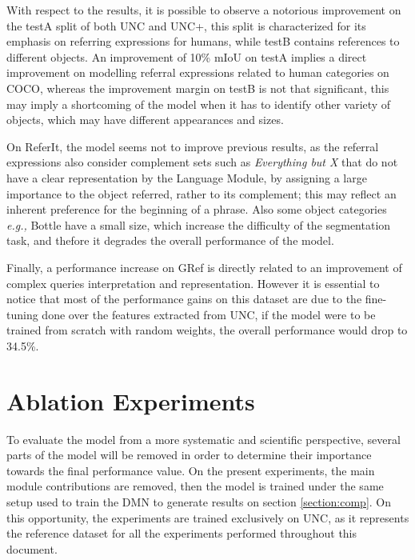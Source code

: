 With respect to the results, it is possible to observe a notorious improvement on the testA split of both UNC and UNC+, this split is characterized for its emphasis on referring expressions for humans, while testB contains references to different objects. An improvement of 10\% mIoU on testA implies a direct improvement on modelling referral expressions related to human categories on COCO, whereas the improvement margin on testB is not that significant, this may imply a shortcoming of the model when it has to identify other variety of objects, which may have different appearances and sizes.

On ReferIt, the model seems not to improve previous results, as the referral expressions also consider complement sets such as \textit{Everything but X} that do not have a clear representation by the Language Module, by assigning a large importance to the object referred, rather to its complement; this may reflect an inherent preference for the beginning of a phrase. Also some object categories \textit{e.g.,} Bottle have a small size, which increase the difficulty of the segmentation task, and thefore it degrades the overall performance of the model.

Finally, a performance increase on GRef is directly related to an improvement of complex queries interpretation and representation. However it is essential to notice that most of the performance gains on this dataset are due to the fine-tuning done over the features extracted from UNC, if the model were to be trained from scratch with random weights, the overall performance would drop to 34.5\%.

\section{Ablation Experiments}
\label{section:ablation}
To evaluate the model from a more systematic and scientific perspective, several parts of the model will be removed in order to determine their importance towards the final performance value. On the present experiments, the main module contributions are removed, then the model is trained under the same setup used to train the DMN to generate results on section \ref{section:comp}. On this opportunity, the experiments are trained exclusively on UNC, as it represents the reference dataset for all the experiments performed throughout this document.

